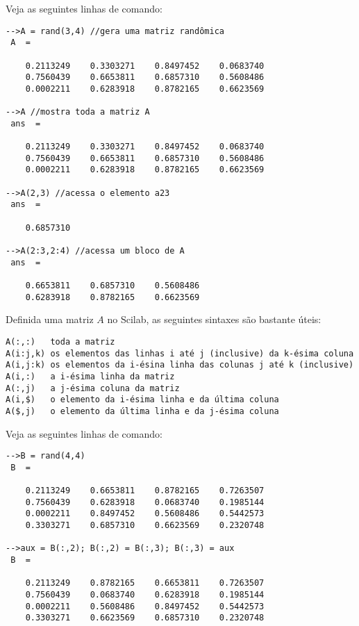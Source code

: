 \begin{ex}
  Veja as seguintes linhas de comando:
\begin{verbatim}
-->A = rand(3,4) //gera uma matriz randômica
 A  =
 
    0.2113249    0.3303271    0.8497452    0.0683740  
    0.7560439    0.6653811    0.6857310    0.5608486  
    0.0002211    0.6283918    0.8782165    0.6623569  
 
-->A //mostra toda a matriz A
 ans  =
 
    0.2113249    0.3303271    0.8497452    0.0683740  
    0.7560439    0.6653811    0.6857310    0.5608486  
    0.0002211    0.6283918    0.8782165    0.6623569  
 
-->A(2,3) //acessa o elemento a23
 ans  =
 
    0.6857310  
 
-->A(2:3,2:4) //acessa um bloco de A
 ans  =
 
    0.6653811    0.6857310    0.5608486  
    0.6283918    0.8782165    0.6623569  
\end{verbatim}
\end{ex}

Definida uma matriz $A$ no Scilab, as seguintes sintaxes são bastante úteis:
\begin{verbatim}
A(:,:)   toda a matriz
A(i:j,k) os elementos das linhas i até j (inclusive) da k-ésima coluna
A(i,j:k) os elementos da i-ésina linha das colunas j até k (inclusive)
A(i,:)   a i-ésima linha da matriz
A(:,j)   a j-ésima coluna da matriz
A(i,$)   o elemento da i-ésima linha e da última coluna
A($,j)   o elemento da última linha e da j-ésima coluna
\end{verbatim}

\begin{ex}
Veja as seguintes linhas de comando:
\begin{verbatim}
-->B = rand(4,4)
 B  =
 
    0.2113249    0.6653811    0.8782165    0.7263507  
    0.7560439    0.6283918    0.0683740    0.1985144  
    0.0002211    0.8497452    0.5608486    0.5442573  
    0.3303271    0.6857310    0.6623569    0.2320748  
 
-->aux = B(:,2); B(:,2) = B(:,3); B(:,3) = aux
 B  =
 
    0.2113249    0.8782165    0.6653811    0.7263507  
    0.7560439    0.0683740    0.6283918    0.1985144  
    0.0002211    0.5608486    0.8497452    0.5442573  
    0.3303271    0.6623569    0.6857310    0.2320748  
\end{verbatim}
\end{ex}


